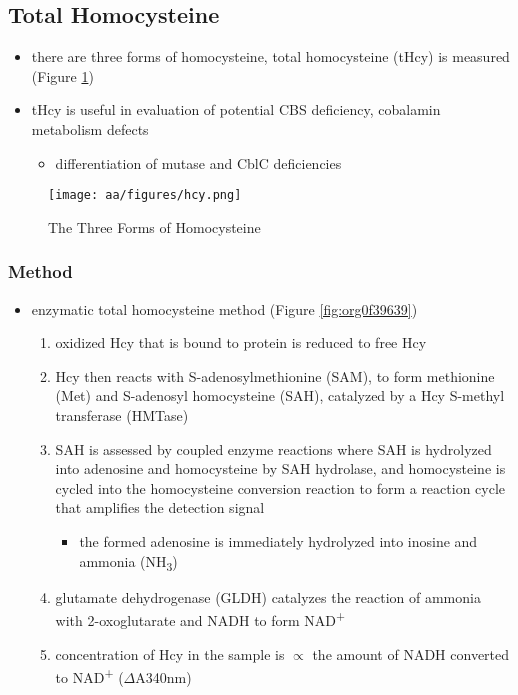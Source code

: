 \documentclass[12pt]{scrartcl}
\begin{document}
\subsection{Total Homocysteine}
\label{sec:orgf3492c4}
\begin{itemize}
\item there are three forms of homocysteine, total homocysteine (tHcy) is
measured (Figure \ref{fig:org04cb39b})
\item tHcy is useful in evaluation of potential CBS deficiency, cobalamin
metabolism defects
\begin{itemize}
\item differentiation of mutase and CblC deficiencies
\end{itemize}
\end{itemize}


\begin{figure}[htbp]
\centering
\texttt{[image: aa/figures/hcy.png]}
\caption{\label{fig:org04cb39b}The Three Forms of Homocysteine}
\end{figure}

\subsubsection{Method}
\label{sec:org45e4fb4}
\begin{itemize}
\item enzymatic total homocysteine method (Figure \ref{fig:org0f39639})
\begin{enumerate}
\item oxidized Hcy that is bound to protein is reduced to free Hcy
\item Hcy then reacts with S-adenosylmethionine (SAM), to form methionine
(Met) and S-adenosyl homocysteine (SAH), catalyzed by a Hcy
S-methyl transferase (HMTase)
\item SAH is assessed by coupled enzyme reactions where SAH is hydrolyzed
into adenosine and homocysteine by SAH hydrolase, and homocysteine
is cycled into the homocysteine conversion reaction to form a
reaction cycle that amplifies the detection signal
\begin{itemize}
\item the formed adenosine is immediately hydrolyzed into inosine and
ammonia (NH\textsubscript{3})
\end{itemize}
\item glutamate dehydrogenase (GLDH) catalyzes the reaction of ammonia
with 2-oxoglutarate and NADH to form NAD\textsuperscript{+}
\item concentration of Hcy in the sample is \(\propto\) the amount of NADH
converted to NAD\textsuperscript{+} (\(\Delta\)A340nm)
\end{enumerate}
\end{itemize}
\end{document}
